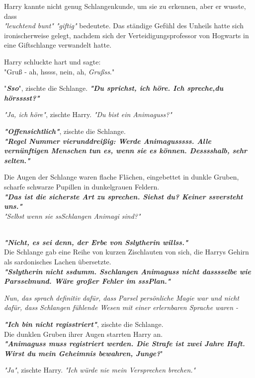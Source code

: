 {Harry kannte nicht genug Schlangenkunde, um sie zu erkennen, aber er wusste, dass\\ \emph{"leuchtend bunt" "giftig"} bedeutete. Das ständige Gefühl des Unheils hatte sich ironischerweise gelegt, nachdem sich der Verteidigungsprofessor von Hogwarts in eine Giftschlange verwandelt hatte.

Harry schluckte hart und sagte:\\ "Gruß - ah, hssss, nein, ah, \emph{Grußss}."

"\textbf{\emph{Sso}}", zischte die Schlange. \textbf{\emph{"Du sprichst, ich höre. Ich spreche,du hörsssst?"}}

\emph{"Ja, ich höre"}, zischte Harry. \emph{"Du bist ein Animaguss?"}

\textbf{\emph{"Offensichtlich"}}, zischte die Schlange.\\ \textbf{\emph{"Regel Nummer vierunddreißig: Werde Animagusssss. Alle vernünftigen Menschen tun es, wenn sie es können. Desssshalb, sehr selten."}}

Die Augen der Schlange waren flache Flächen, eingebettet in dunkle Gruben, scharfe schwarze Pupillen in dunkelgrauen Feldern.\\ \textbf{\emph{"Das ist die sicherste Art zu sprechen. Siehst du? Keiner ssversteht uns."}}\\ \emph{\hfill\break "Selbst wenn sie ssSchlangen Animagi sind?"\\ }\strut \\ \textbf{\emph{"Nicht, es sei denn, der Erbe von Sslytherin willss."}}\\ Die Schlange gab eine Reihe von kurzen Zischlauten von sich, die Harrys Gehirn als sardonisches Lachen übersetzte.\\ \textbf{\emph{"Sslytherin nicht ssdumm. Sschlangen Animaguss nicht dasssselbe wie Parsselmund. Wäre großer Fehler im sssPlan."}}

\emph{Nun, das sprach definitiv dafür, dass Parsel persönliche Magie war und nicht dafür, dass Schlangen fühlende Wesen mit einer erlernbaren Sprache waren -}

\textbf{\emph{"Ich bin nicht regisstriert"}}, zischte die Schlange.\\ Die dunklen Gruben ihrer Augen starrten Harry an.\\ \textbf{\emph{"Animaguss muss registriert werden. Die Strafe ist zwei Jahre Haft. Wirst du mein Geheimnis bewahren, Junge?}}"

\emph{"Ja"}, zischte Harry. \emph{"Ich würde nie mein Versprechen brechen."}

}
